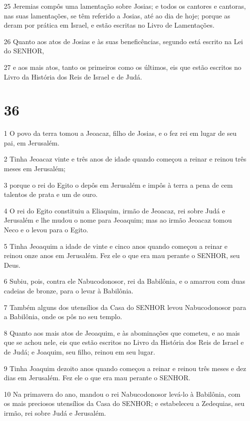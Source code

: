 \par 25 Jeremias compôs uma lamentação sobre Josias; e todos os cantores e cantoras, nas suas lamentações, se têm referido a Josias, até ao dia de hoje; porque as deram por prática em Israel, e estão escritas no Livro de Lamentações.
\par 26 Quanto aos atos de Josias e às suas beneficências, segundo está escrito na Lei do SENHOR,
\par 27 e aos mais atos, tanto os primeiros como os últimos, eis que estão escritos no Livro da História dos Reis de Israel e de Judá.

\chapter{36}

\par 1 O povo da terra tomou a Jeoacaz, filho de Josias, e o fez rei em lugar de seu pai, em Jerusalém.
\par 2 Tinha Jeoacaz vinte e três anos de idade quando começou a reinar e reinou três meses em Jerusalém;
\par 3 porque o rei do Egito o depôs em Jerusalém e impôs à terra a pena de cem talentos de prata e um de ouro.
\par 4 O rei do Egito constituiu a Eliaquim, irmão de Jeoacaz, rei sobre Judá e Jerusalém e lhe mudou o nome para Jeoaquim; mas ao irmão Jeoacaz tomou Neco e o levou para o Egito.
\par 5 Tinha Jeoaquim a idade de vinte e cinco anos quando começou a reinar e reinou onze anos em Jerusalém. Fez ele o que era mau perante o SENHOR, seu Deus.
\par 6 Subiu, pois, contra ele Nabucodonosor, rei da Babilônia, e o amarrou com duas cadeias de bronze, para o levar à Babilônia.
\par 7 Também alguns dos utensílios da Casa do SENHOR levou Nabucodonosor para a Babilônia, onde os pôs no seu templo.
\par 8 Quanto aos mais atos de Jeoaquim, e às abominações que cometeu, e ao mais que se achou nele, eis que estão escritos no Livro da História dos Reis de Israel e de Judá; e Joaquim, seu filho, reinou em seu lugar.
\par 9 Tinha Joaquim dezoito anos quando começou a reinar e reinou três meses e dez dias em Jerusalém. Fez ele o que era mau perante o SENHOR.
\par 10 Na primavera do ano, mandou o rei Nabucodonosor levá-lo à Babilônia, com os mais preciosos utensílios da Casa do SENHOR; e estabeleceu a Zedequias, seu irmão, rei sobre Judá e Jerusalém.
